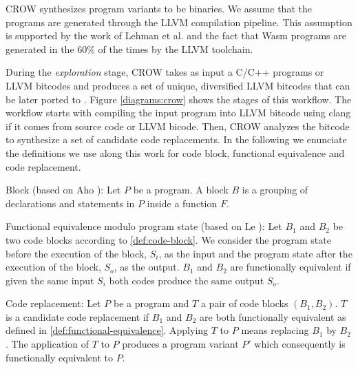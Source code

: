 
CROW synthesizes program variants to be \wasm binaries. We assume that the programs are generated through the LLVM compilation pipeline. This assumption is supported by the work of Lehman et al. \cite{} and the fact that Wasm programs are generated in the 60\% of the times by the LLVM toolchain.

During the \emph{exploration} stage, CROW takes as input a C/C++ programs or LLVM bitcodes and produces a set of unique, diversified LLVM bitcodes that can be later ported to \wasm.
Figure \ref{diagrams:crow} shows the stages of this workflow. The workflow starts with compiling the input program into LLVM bitcode using clang if it comes from source code or LLVM bicode. Then, CROW analyzes the bitcode to synthesize a set of candidate code replacements. In the following we enunciate the definitions we use along this work for code block, functional equivalence and code replacement. 


\begin{definition}{Block (based on Aho \etal \cite{10.5555/6448}):}\label{def:code-block}
    Let $P$ be a program. A block $B$ is a grouping of declarations and statements in $P$ inside a function $F$. 
\end{definition}


\begin{definition}{Functional equivalence modulo program state (based on Le \etal \cite{10.1145/2594291.2594334}):}
    \label{def:functional-equivalence}
    Let $B_1$ and $B_2$ be two code blocks according to \autoref{def:code-block}. We consider the program state before the execution of the block, $S_i$, as the input and the program state after the execution of the block, $S_o$, as the output. $B_1$ and $B_2$ are functionally equivalent if given the same input $S_i$ both codes produce the same output $S_o$.
\end{definition}

\begin{definition}{Code replacement:}
    \label{def:code-replacement}
    Let $P$ be a program and $T$ a pair of code blocks $(B_1, B_2)$. $T$ is a candidate code replacement if $B_1$ and $B_2$ are both functionally equivalent as defined in \autoref{def:functional-equivalence}.
    Applying $T$ to $P$ means replacing $B_1$ by $B_2$. The application of $T$ to $P$ produces a program variant $P'$ which consequently is functionally equivalent to $P$.     
\end{definition}

